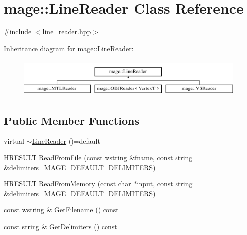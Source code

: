 \hypertarget{classmage_1_1_line_reader}{}\section{mage\+:\+:Line\+Reader Class Reference}
\label{classmage_1_1_line_reader}


{\ttfamily \#include $<$line\+\_\+reader.\+hpp$>$}

Inheritance diagram for mage\+:\+:Line\+Reader\+:\begin{figure}[H]
\begin{center}
\leavevmode
\includegraphics[height=1.964912cm]{classmage_1_1_line_reader}
\end{center}
\end{figure}
\subsection*{Public Member Functions}
\begin{DoxyCompactItemize}
\item 
virtual \hyperlink{classmage_1_1_line_reader_aa058c338d8256d7f7b775bf4f7052508}{$\sim$\+Line\+Reader} ()=default
\item 
H\+R\+E\+S\+U\+LT \hyperlink{classmage_1_1_line_reader_a3b124e598e5b005476951b882dd85ea7}{Read\+From\+File} (const wstring \&fname, const string \&delimiters=M\+A\+G\+E\+\_\+\+D\+E\+F\+A\+U\+L\+T\+\_\+\+D\+E\+L\+I\+M\+I\+T\+E\+RS)
\item 
H\+R\+E\+S\+U\+LT \hyperlink{classmage_1_1_line_reader_a340d9f9a0d148b3a4dbe7ba300cfaca4}{Read\+From\+Memory} (const char $\ast$input, const string \&delimiters=M\+A\+G\+E\+\_\+\+D\+E\+F\+A\+U\+L\+T\+\_\+\+D\+E\+L\+I\+M\+I\+T\+E\+RS)
\item 
const wstring \& \hyperlink{classmage_1_1_line_reader_a64a800d9fe9c242b9b14d034a7d604eb}{Get\+Filename} () const
\item 
const string \& \hyperlink{classmage_1_1_line_reader_a7de405beff27d5cc55bb93e1b1e9727a}{Get\+Delimiters} () const
\end{DoxyCompactItemize}
